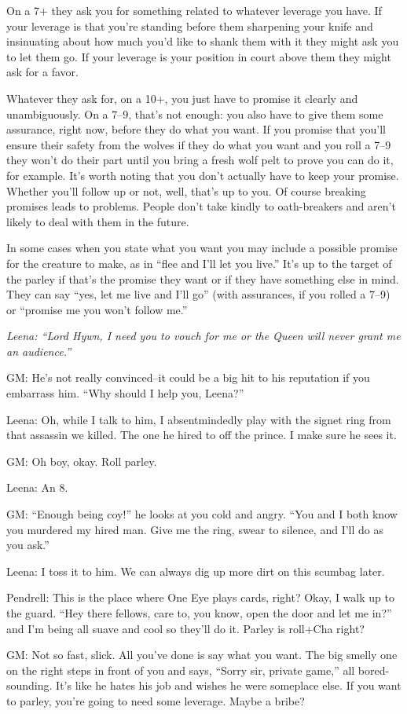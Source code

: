 On a 7+ they ask you for something related to whatever leverage you have. If your leverage is that you're standing before them sharpening your knife and insinuating about how much you'd like to shank them with it they might ask you to let them go. If your leverage is your position in court above them they might ask for a favor.

Whatever they ask for, on a 10+, you just have to promise it clearly and unambiguously. On a 7--9, that's not enough: you also have to give them some assurance, right now, before they do what you want. If you promise that you'll ensure their safety from the wolves if they do what you want and you roll a 7--9 they won't do their part until you bring a fresh wolf pelt to prove you can do it, for example. It's worth noting that you don't actually have to keep your promise. Whether you'll follow up or not, well, that's up to you. Of course breaking promises leads to problems. People don't take kindly to oath-breakers and aren't likely to deal with them in the future.

In some cases when you state what you want you may include a possible promise for the creature to make, as in ``flee and I'll let you live.'' It's up to the target of the parley if that's the promise they want or if they have something else in mind. They can say ``yes, let me live and I'll go'' (with assurances, if you rolled a 7--9) or ``promise me you won't follow me.''

{\itshape
Leena: ``Lord Hywn, I need you to vouch for me or the Queen will never grant me an audience.''

GM: He's not really convinced--it could be a big hit to his reputation if you embarrass him. ``Why should I help you, Leena?''

Leena: Oh, while I talk to him, I absentmindedly play with the signet ring from that assassin we killed. The one he hired to off the prince. I make sure he sees it.

GM: Oh boy, okay. Roll parley.

Leena: An 8.

GM: ``Enough being coy!'' he looks at you cold and angry. ``You and I both know you murdered my hired man. Give me the ring, swear to silence, and I'll do as you ask.''

Leena: I toss it to him. We can always dig up more dirt on this scumbag later.

Pendrell: This is the place where One Eye plays cards, right? Okay, I walk up to the guard. ``Hey there fellows, care to, you know, open the door and let me in?'' and I'm being all suave and cool so they'll do it. Parley is roll+Cha right?

GM: Not so fast, slick. All you've done is say what you want. The big smelly one on the right steps in front of you and says, ``Sorry sir, private game,'' all bored-sounding. It's like he hates his job and wishes he were someplace else. If you want to parley, you're going to need some leverage. Maybe a bribe?
}
